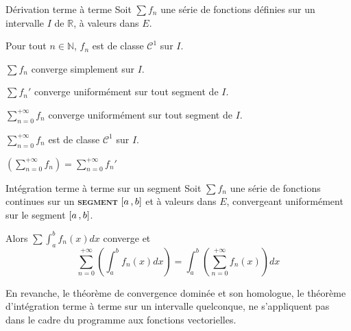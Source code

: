     \begin{theo}{Dérivation terme à terme}{}
        Soit $\sum f_n$ une série de fonctions définies sur un intervalle $I$ de $\mathbb{R}$, à valeurs dans $E$. \begin{suppose}
            \item Pour tout $n \in \mathbb{N}$, $f_n$ est de classe $\mathcal{C}^1$ sur $I$.
            \item $\sum f_n$ converge simplement sur $I$.
            \item $\sum f_n'$ converge uniformément sur tout segment de $I$.
        \end{suppose}
        \begin{alors}
            \item $\sum_{n=0}^{+\infty} f_n$ converge uniformément sur tout segment de $I$.
            \item $\sum_{n=0}^{+\infty} f_n$ est de classe $\mathcal{C}^1$ sur $I$.
            \item $\left(\sum_{n=0}^{+\infty} f_n\right) = \sum_{n=0}^{+\infty} f_n'$
        \end{alors}
    \end{theo}

    \begin{theo}{Intégration terme à terme sur un segment}{}
        Soit $\sum f_n$ une série de fonctions continues sur un \textbf{\textsc{segment}} $\left[ a \, , b \right]$ et à valeurs dans $E$, convergeant uniformément sur le segment $\left[ a \, , b \right]$. 

        Alors $\sum  \int_{a}^{b} f_n(x)dx$ converge et 
        \[ \sum_{n=0}^{+\infty} \left(\int_{a}^{b} f_n(x) dx\right) = \int_{a}^{b} \left(\sum_{n=0}^{+\infty} f_n(x)\right) dx \]
    \end{theo}

    En revanche, le théorème de convergence dominée et son homologue, le théorème d’intégration terme à terme sur un intervalle quelconque, ne s’appliquent pas dans le cadre du programme aux fonctions vectorielles.

\newpage